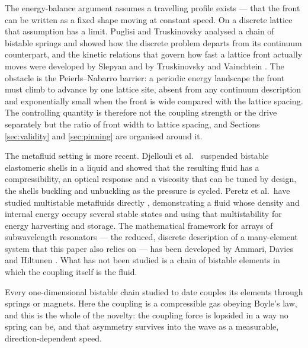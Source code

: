 The energy-balance argument assumes a travelling profile exists --- that the front
can be written as a fixed shape moving at constant speed. On a discrete lattice
that assumption has a limit. Puglisi and Truskinovsky \cite{puglisi2000mechanics}
analysed a chain of bistable springs and showed how the discrete problem departs
from its continuum counterpart, and the kinetic relations that govern how fast a
lattice front actually moves were developed by Slepyan \cite{slepyan2002models}
and by Truskinovsky and Vainchtein \cite{truskinovsky2005kinetics}. The obstacle
is the Peierls--Nabarro barrier: a periodic energy landscape the front must climb
to advance by one lattice site, absent from any continuum description and
exponentially small when the front is wide compared with the lattice spacing. The
controlling quantity is therefore not the coupling strength or the drive
separately but the ratio of front width to lattice spacing, and Sections
\ref{sec:validity} and \ref{sec:pinning} are organised around it.

The metafluid setting is more recent. Djellouli et al.\
\cite{djellouli2024metafluid} suspended bistable elastomeric shells in a liquid
and showed that the resulting fluid has a compressibility, an optical response and
a viscosity that can be tuned by design, the shells buckling and unbuckling as the
pressure is cycled. Peretz et al.\ have studied multistable metafluids
directly \cite{peretz2022metafluid,peretz2023harvesting}, demonstrating a fluid whose
density and internal energy occupy several stable states and using that multistability
for energy harvesting and storage. The
mathematical framework for arrays of subwavelength resonators --- the reduced,
discrete description of a many-element system that this paper also relies on ---
has been developed by Ammari, Davies and Hiltunen \cite{ammari2023functional}.
What has not been studied is a chain of bistable elements in which the coupling
itself is the fluid.

Every one-dimensional bistable chain studied to date couples its elements through
springs or magnets. Here the coupling is a compressible gas obeying Boyle's law,
and this is the whole of the novelty: the coupling force is lopsided in a way no
spring can be, and that asymmetry survives into the wave as a measurable,
direction-dependent speed.



